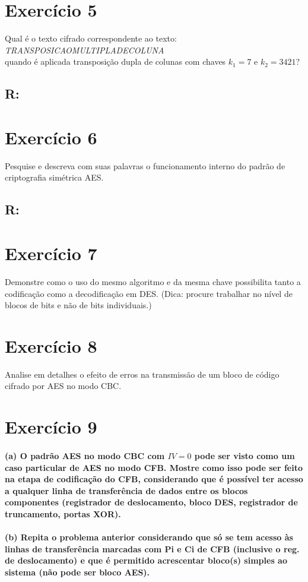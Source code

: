\documentclass[10pt,a4paper]{article}
\begin{document}
\section*{Exercício 5}
Qual é o texto cifrado correspondente ao texto:\\ \emph{TRANSPOSICAOMULTIPLADECOLUNA}\\ quando é aplicada transposição dupla de colunas com chaves $k_1=7$ e $k_2= 3421$?
\subsection*{R:}
\section*{Exercício 6}
Pesquise e descreva com suas palavras o funcionamento interno do padrão de criptografia simétrica AES.
\subsection*{R:}
\section*{Exercício 7}
Demonstre como o uso do mesmo algoritmo e da mesma chave possibilita tanto a codificação como a decodificação em DES. (Dica: procure trabalhar no nível de blocos de bits e não de bits individuais.)
\section*{Exercício 8}
Analise em detalhes o efeito de erros na transmissão de um bloco de código cifrado por AES no modo CBC.
\section*{Exercício 9}
\paragraph*{(a) O padrão AES no modo CBC com $IV=0$ pode ser visto como um caso particular de AES no modo CFB. Mostre como isso pode ser feito na etapa de codificação do CFB, considerando que é possível ter acesso a qualquer linha de transferência de dados entre os blocos componentes (registrador de deslocamento, bloco DES, registrador de truncamento, portas XOR).}
\paragraph*{(b) Repita o problema anterior considerando que só se tem acesso às linhas de transferência marcadas com Pi e Ci de CFB (inclusive o reg. de deslocamento) e que é permitido acrescentar bloco(s) simples ao sistema (não pode ser bloco AES).}
\end{document}
